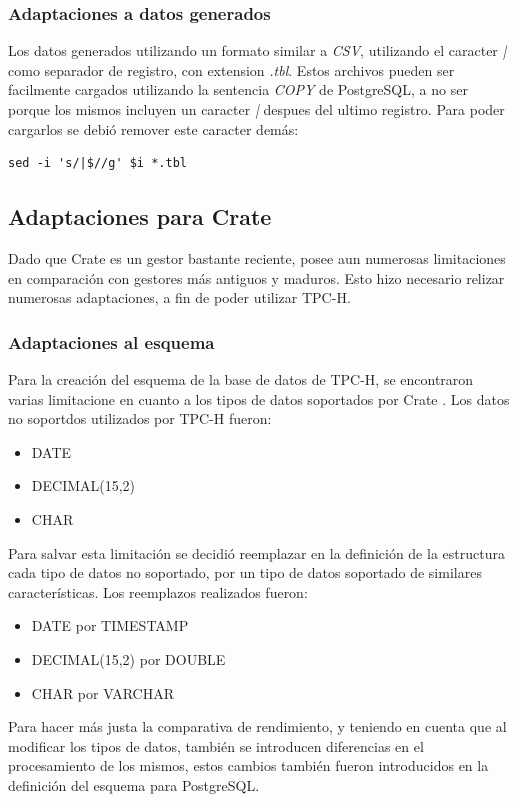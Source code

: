 \documentclass[11pt, twocolumns]{article}
\begin{document}
\begin{multicols}{2}
\subsubsection{Adaptaciones a datos generados}
Los datos generados utilizando un formato similar a \textit{CSV}, utilizando el caracter \textit{|} como separador de registro, con extension \textit{.tbl}. Estos archivos pueden ser facilmente cargados utilizando la sentencia \textit{COPY} de PostgreSQL, a no ser porque los mismos incluyen un caracter \textit{|} despues del ultimo registro. Para poder cargarlos se debió remover este caracter demás:
\begin{verbatim}
sed -i 's/|$//g' $i *.tbl
\end{verbatim}

\subsection{Adaptaciones para Crate}
Dado que Crate es un gestor bastante reciente, posee aun numerosas limitaciones en comparación con gestores más antiguos y maduros. Esto hizo necesario relizar numerosas adaptaciones, a fin de poder utilizar TPC-H.

\subsubsection{Adaptaciones al esquema}
Para la creación del esquema de la base de datos de TPC-H, se encontraron varias limitacione en cuanto a los tipos de datos soportados por Crate \cite{crate}. Los datos no soportdos utilizados por TPC-H fueron:
\begin{itemize}
  \item DATE
  \item DECIMAL(15,2)
  \item CHAR
\end{itemize}
Para salvar esta limitación se decidió reemplazar en la definición de la estructura cada tipo de datos no soportado, por un tipo de datos soportado de similares características. Los reemplazos realizados fueron:
\begin{itemize}
  \item DATE por TIMESTAMP
  \item DECIMAL(15,2) por DOUBLE
  \item CHAR por VARCHAR
\end{itemize}
Para hacer más justa la comparativa de rendimiento, y teniendo en cuenta que al modificar los tipos de datos, también se introducen diferencias en el procesamiento de los mismos, estos cambios también fueron introducidos en la definición del esquema para PostgreSQL.
  

\end{multicols}
\end{document}
